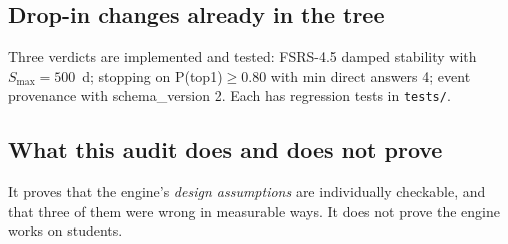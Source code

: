 \subsection{Drop-in changes already in the tree}
Three verdicts are implemented and tested: FSRS-4.5 damped stability with $S_{\max}=500$~d; stopping on P(top1)$\ge$0.80 with min direct answers 4; event provenance with schema\_version 2. Each has regression tests in \texttt{tests/}.

\subsection{What this audit does and does not prove}
It proves that the engine's \emph{design assumptions} are individually checkable, and that three of them were wrong in measurable ways. It does not prove the engine works on students.
